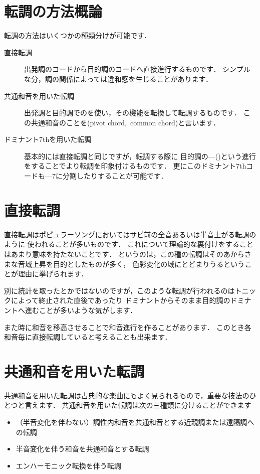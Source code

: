 \documentclass[dvipdfmx,uplatex,b5paper,openany,jbase=12Q,nomag*,textwidth-limit=44%
               ]{gachimuchi}[2020/05/05]
\begin{document}
\section{転調の方法概論}
転調の方法はいくつかの種類分けが可能です．

\begin{description}
\item[直接転調]
出発調のコードから目的調のコードへ直接進行するものです．
シンプルな分，調の関係によっては違和感を生じることがあります．

\item[共通和音を用いた転調]
出発調と目的調でのを使い，その機能を転換して転調するものです．
この共通和音のことを\xkanjispace(pivot chord,\ common chord)と言います．

\item[ドミナント7thを用いた転調]
基本的には直接転調と同じですが，転調する際に
目的調の\Gnv{}---\Gni(\Min)という進行をすることでより転調を印象付けるものです．
更にこのドミナント7thコードも\Gnii\Min{}---\Gnv\subsc7に分割したりすることが可能です．
\end{description}

\section{直接転調}
直接転調はポピュラーソングにおいてはサビ前の全音あるいは半音上がる転調のように
使われることが多いものです．
これについて理論的な裏付けをすることはあまり意味を持たないことです．
というのは，この種の転調はそのあからさまな音域上昇を目的としたものが多く，
色彩変化の域にとどまりうるということが理由に挙げられます．

\begin{Yodan}
別に統計を取ったとかではないのですが，このような転調が行われるのはトニックによって終止された直後であったり
ドミナントからそのまま目的調のドミナントへ進むことが多いような気がします．
\end{Yodan}

また時に和音を移高させることで和音進行を作ることがあります．
このとき各和音毎に直接転調していると考えることも出来ます．


\section{共通和音を用いた転調}
共通和音を用いた転調は古典的な楽曲にもよく見られるもので，重要な技法のひとつと言えます．
共通和音を用いた転調は次の三種類に分けることができます
\begin{itemize}
  \item （半音変化を伴わない）調性内和音を共通和音とする近親調または遠隔調への転調
  \item 半音変化を伴う和音を共通和音とする転調
  \item エンハーモニック転換を伴う転調
\end{itemize}
\end{document}
